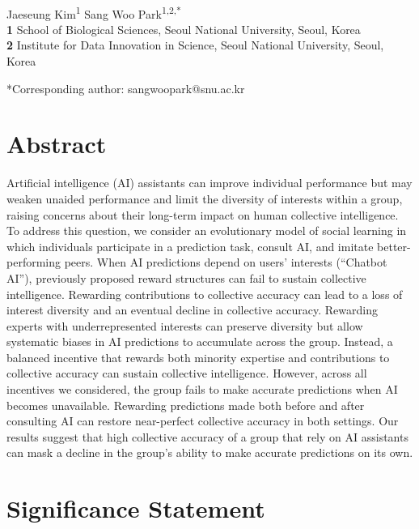 \documentclass[12pt]{article}
\date{\today}
\begin{document}
\begin{flushleft}{
	\Large
	\textbf{}
}
\newline
\\
Jaeseung Kim\textsuperscript{1} Sang Woo Park\textsuperscript{1,2,*}
\\
\bigskip
\textbf{1} School of Biological Sciences, Seoul National University, Seoul, Korea\\
\textbf{2} Institute for Data Innovation in Science, Seoul National University, Seoul, Korea
\bigskip

*Corresponding author: sangwoopark@snu.ac.kr
\end{flushleft}

\section*{Abstract}
Artificial intelligence (AI) assistants can improve individual performance but may weaken unaided performance and limit the diversity of interests within a group, raising concerns about their long-term impact on human collective intelligence. 
To address this question, we consider an evolutionary model of social learning in which individuals participate in a prediction task, consult AI, and imitate better-performing peers.
When AI predictions depend on users’ interests (``Chatbot AI''), previously proposed reward structures can fail to sustain collective intelligence.
Rewarding contributions to collective accuracy can lead to a loss of interest diversity and an eventual decline in collective accuracy.
Rewarding experts with underrepresented interests can preserve diversity but allow systematic biases in AI predictions to accumulate across the group.
Instead, a balanced incentive that rewards both minority expertise and contributions to collective accuracy can sustain collective intelligence.
However, across all incentives we considered, the group fails to make accurate predictions when AI becomes unavailable.
Rewarding predictions made both before and after consulting AI can restore near-perfect collective accuracy in both settings.
Our results suggest that high collective accuracy of a group that rely on AI assistants can mask a decline in the group’s ability to make accurate predictions on its own.

\section*{Significance Statement}
\end{document}
